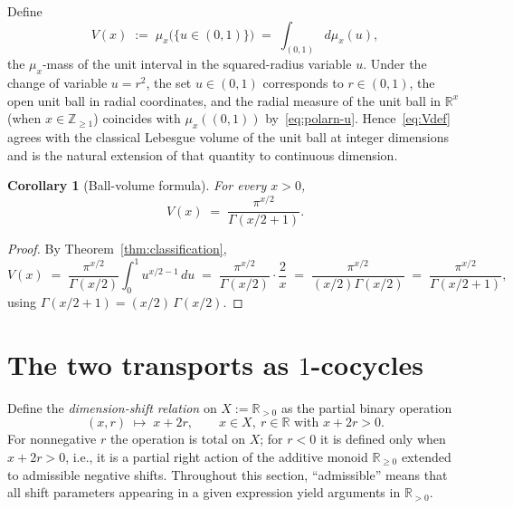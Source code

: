 \documentclass[11pt,a4paper]{article}
\theoremstyle{plain}
\newtheorem{corollary}[theorem]{Corollary}
\theoremstyle{definition}
\theoremstyle{remark}
\newcommand{\R}{\mathbb{R}}
\newcommand{\Z}{\mathbb{Z}}
\begin{document}
Define
\begin{equation}\label{eq:Vdef}
V(x) \;:=\; \mu_x\bigl(\{u\in(0,1)\}\bigr)
\;=\; \int_{(0,1)} d\mu_x(u),
\end{equation}
the $\mu_x$-mass of the unit interval in the squared-radius variable $u$. Under the change of variable $u=r^2$, the set $u\in(0,1)$ corresponds to $r\in(0,1)$, the open unit ball in radial coordinates, and the radial measure of the unit ball in $\R^x$ (when $x\in\Z_{\ge 1}$) coincides with $\mu_x((0,1))$ by~\eqref{eq:polarn-u}. Hence~\eqref{eq:Vdef} agrees with the classical Lebesgue volume of the unit ball at integer dimensions and is the natural extension of that quantity to continuous dimension.

\begin{corollary}[Ball-volume formula]\label{cor:Vx}
For every $x>0$,
\[
V(x) \;=\; \frac{\pi^{x/2}}{\Gamma(x/2+1)}.
\]
\end{corollary}

\begin{proof}
By Theorem~\ref{thm:classification},
\[
V(x) \;=\; \frac{\pi^{x/2}}{\Gamma(x/2)}\int_0^1 u^{x/2-1}\,du \;=\; \frac{\pi^{x/2}}{\Gamma(x/2)}\cdot\frac{2}{x} \;=\; \frac{\pi^{x/2}}{(x/2)\Gamma(x/2)} \;=\; \frac{\pi^{x/2}}{\Gamma(x/2+1)},
\]
using $\Gamma(x/2+1) = (x/2)\,\Gamma(x/2)$.
\end{proof}

\section{The two transports as $1$-cocycles}\label{sec:cocycles}

Define the \emph{dimension-shift relation} on $X := \R_{>0}$ as the partial binary operation
\begin{equation}\label{eq:Rshift}
(x,r) \;\longmapsto\; x + 2r, \qquad x\in X,\ r\in\R\text{ with } x+2r>0.
\end{equation}
For nonnegative $r$ the operation is total on $X$; for $r<0$ it is defined only when $x+2r>0$, i.e., it is a partial right action of the additive monoid $\R_{\ge 0}$ extended to admissible negative shifts. Throughout this section, ``admissible'' means that all shift parameters appearing in a given expression yield arguments in $\R_{>0}$.
\end{document}
